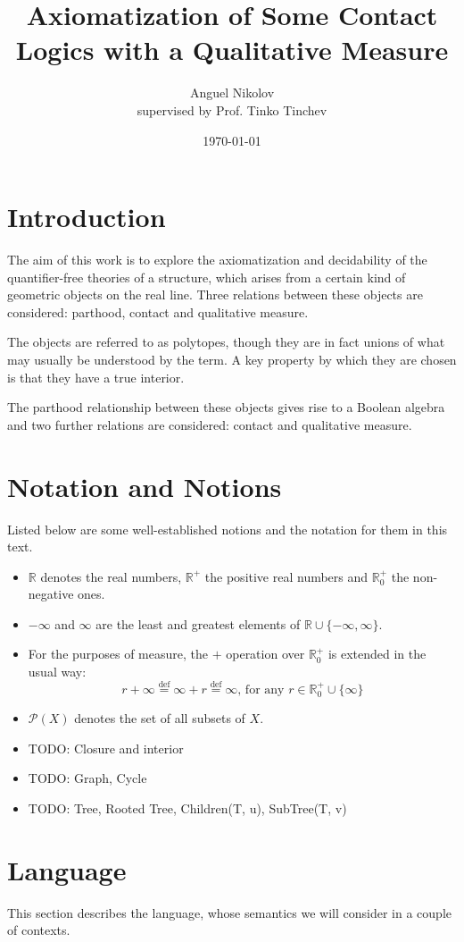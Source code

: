 \documentclass{article}
\title{Axiomatization of Some Contact Logics with a Qualitative Measure}
\author{Anguel Nikolov\\{\small supervised by Prof. Tinko Tinchev}}
\affil{Faculty of Mathematics and Informatics \\
  Sofia University ``St. Kliment Ohridski''}
\date{\today}
\newcommand{\R}{\mathbb{R}}
\newcommand{\pwrset}{\mathcal{P}}
\newcommand{\eqdef}{\stackrel{\text{def}}{=}}
\begin{document}
\maketitle

\section{Introduction}

The aim of this work is to explore the axiomatization and decidability of the quantifier-free theories of a structure, which arises from a certain kind of geometric objects on the real line. Three relations between these objects are considered: parthood, contact and qualitative measure.

The objects are referred to as polytopes, though they are in fact unions of what may usually be understood by the term. A key property by which they are chosen is that they have a true interior.

The parthood relationship between these objects gives rise to a Boolean algebra and two further relations are considered: contact and qualitative measure.
\section{Notation and Notions}
Listed below are some well-established notions and the notation for them in this text.
\begin{itemize}
\item $\R$ denotes the real numbers, $\R^+$ the positive real numbers and $\R^+_0$ the non-negative ones.
\item $-\infty$ and $\infty$ are the least and greatest elements of $\R \cup \{-\infty, \infty\}$.
\item For the purposes of measure, the $+$ operation over $\R^+_0$ is extended in the usual way:
  \begin{equation*}
    r + \infty \eqdef \infty + r \eqdef \infty \text{, for any } r \in \R^+_0 \cup \{\infty\}
  \end{equation*}
\item $\pwrset(X)$ denotes the set of all subsets of $X$.
\item TODO: Closure and interior
\item TODO: Graph, Cycle
\item TODO: Tree, Rooted Tree, Children(T, u), SubTree(T, v)
\end{itemize}
\section{Language}
This section describes the language, whose semantics we will consider in a couple of contexts.
\end{document}
